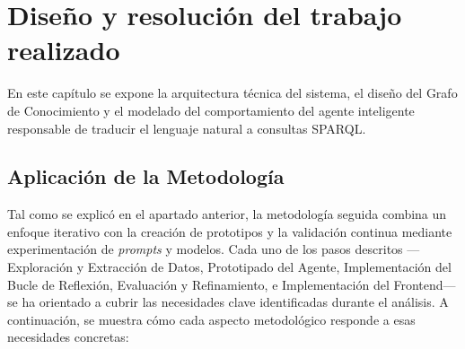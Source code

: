 
\chapter{Diseño y resolución del trabajo realizado}
\label{cap:diseno}

En este capítulo se expone la arquitectura técnica del sistema, el diseño del Grafo de Conocimiento y el modelado del comportamiento del agente inteligente responsable de traducir el lenguaje natural a consultas SPARQL.

\section{Aplicación de la Metodología}

Tal como se explicó en el apartado anterior, la metodología seguida combina un enfoque iterativo con la creación de prototipos y la validación continua mediante experimentación de \textit{prompts} y modelos. Cada uno de los pasos descritos —Exploración y Extracción de Datos, Prototipado del Agente, Implementación del Bucle de Reflexión, Evaluación y Refinamiento, e Implementación del Frontend— se ha orientado a cubrir las necesidades clave identificadas durante el análisis. A continuación, se muestra cómo cada aspecto metodológico responde a esas necesidades concretas:

